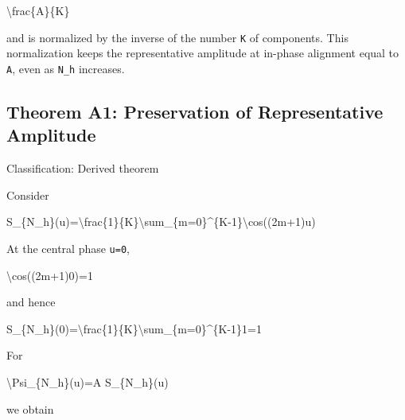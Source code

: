 \documentclass[
  a4paper,
]{article}
\newenvironment{Shaded}{}{}
\newcommand{\NormalTok}[1]{#1}
\begin{document}
\begin{Shaded}
\begin{Highlighting}[]
\NormalTok{\textbackslash{}frac\{A\}\{K\}}
\end{Highlighting}
\end{Shaded}

and is normalized by the inverse of the number \texttt{K} of components.
This normalization keeps the representative amplitude at in-phase
alignment equal to \texttt{A}, even as \texttt{N\_h} increases.

\subsection{Theorem A1: Preservation of Representative
Amplitude}\label{theorem-a1-preservation-of-representative-amplitude}

Classification: Derived theorem

Consider

\begin{Shaded}
\begin{Highlighting}[]
\NormalTok{S\_\{N\_h\}(u)=\textbackslash{}frac\{1\}\{K\}\textbackslash{}sum\_\{m=0\}\^{}\{K{-}1\}\textbackslash{}cos((2m+1)u)}
\end{Highlighting}
\end{Shaded}

At the central phase \texttt{u=0},

\begin{Shaded}
\begin{Highlighting}[]
\NormalTok{\textbackslash{}cos((2m+1)0)=1}
\end{Highlighting}
\end{Shaded}

and hence

\begin{Shaded}
\begin{Highlighting}[]
\NormalTok{S\_\{N\_h\}(0)=\textbackslash{}frac\{1\}\{K\}\textbackslash{}sum\_\{m=0\}\^{}\{K{-}1\}1=1}
\end{Highlighting}
\end{Shaded}

For

\begin{Shaded}
\begin{Highlighting}[]
\NormalTok{\textbackslash{}Psi\_\{N\_h\}(u)=A S\_\{N\_h\}(u)}
\end{Highlighting}
\end{Shaded}

we obtain
\end{document}
